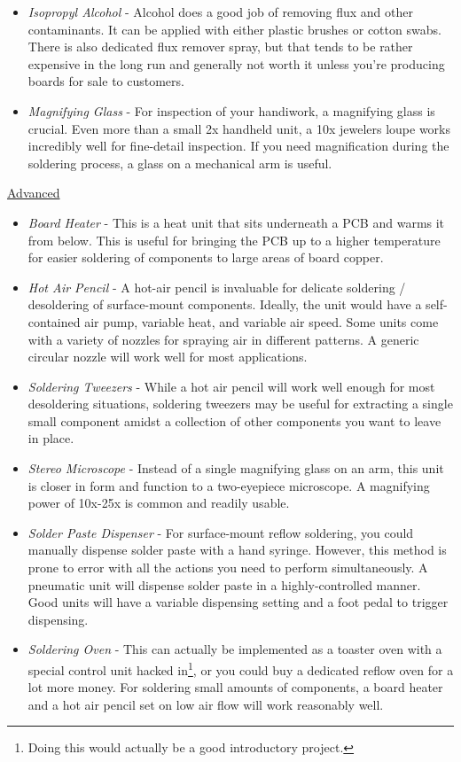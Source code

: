 \begin{itemize}
\item \emph{Isopropyl Alcohol} - Alcohol does a good job of removing flux and other contaminants. It can be applied with either plastic brushes or cotton swabs. There is also dedicated flux remover spray, but that tends to be rather expensive in the long run and generally not worth it unless you're producing boards for sale to customers.
\item \emph{Magnifying Glass} - For inspection of your handiwork, a magnifying glass is crucial. Even more than a small 2x handheld unit, a 10x jewelers loupe works incredibly well for fine-detail inspection. If you need magnification during the soldering process, a glass on a mechanical arm is useful.
\end{itemize}

\underline{Advanced}
\begin{itemize}
\item \emph{Board Heater} - This is a heat unit that sits underneath a PCB and warms it from below. This is useful for bringing the PCB up to a higher temperature for easier soldering of components to large areas of board copper.
\item \emph{Hot Air Pencil} - A hot-air pencil is invaluable for delicate soldering / desoldering of surface-mount components. Ideally, the unit would have a self-contained air pump, variable heat, and variable air speed. Some units come with a variety of nozzles for spraying air in different patterns. A generic circular nozzle will work well for most applications.
\item \emph{Soldering Tweezers} - While a hot air pencil will work well enough for most desoldering situations, soldering tweezers may be useful for extracting a single small component amidst a collection of other components you want to leave in place.
\item \emph{Stereo Microscope} - Instead of a single magnifying glass on an arm, this unit is closer in form and function to a two-eyepiece microscope. A magnifying power of 10x-25x is common and readily usable.
\item \emph{Solder Paste Dispenser} - For surface-mount reflow soldering, you could manually dispense solder paste with a hand syringe. However, this method is prone to error with all the actions you need to perform simultaneously. A pneumatic unit will dispense solder paste in a highly-controlled manner. Good units will have a variable dispensing setting and a foot pedal to trigger dispensing.
\item \emph{Soldering Oven} - This can actually be implemented as a toaster oven with a special control unit hacked in\footnote{Doing this would actually be a good introductory project.}, or you could buy a dedicated reflow oven for a lot more money. For soldering small amounts of components, a board heater and a hot air pencil set on low air flow will work reasonably well.
\end{itemize}

